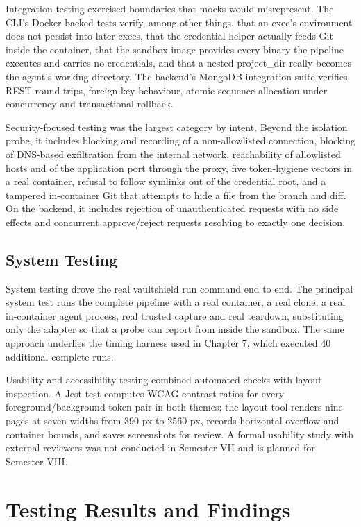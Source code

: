 \documentclass[12pt,a4paper,oneside]{report}
\begin{document}
Integration testing exercised boundaries that mocks would misrepresent. The CLI's Docker-backed tests verify, among other things, that an exec's environment does not persist into later execs, that the credential helper actually feeds Git inside the container, that the sandbox image provides every binary the pipeline executes and carries no credentials, and that a nested project\_\allowbreak{}dir really becomes the agent's working directory. The backend's MongoDB integration suite verifies REST round trips, foreign-key behaviour, atomic sequence allocation under concurrency and transactional rollback.

Security-focused testing was the largest category by intent. Beyond the isolation probe, it includes blocking and recording of a non-allowlisted connection, blocking of DNS-based exfiltration from the internal network, reachability of allowlisted hosts and of the application port through the proxy, five token-hygiene vectors in a real container, refusal to follow symlinks out of the credential root, and a tampered in-container Git that attempts to hide a file from the branch and diff. On the backend, it includes rejection of unauthenticated requests with no side effects and concurrent approve/reject requests resolving to exactly one decision.

\subsection{System Testing}\label{system-testing}

System testing drove the real vaultshield run command end to end. The principal system test runs the complete pipeline with a real container, a real clone, a real in-container agent process, real trusted capture and real teardown, substituting only the adapter so that a probe can report from inside the sandbox. The same approach underlies the timing harness used in Chapter 7, which executed 40 additional complete runs.

Usability and accessibility testing combined automated checks with layout inspection. A Jest test computes WCAG contrast ratios for every foreground/background token pair in both themes; the layout tool renders nine pages at seven widths from 390 px to 2560 px, records horizontal overflow and container bounds, and saves screenshots for review. A formal usability study with external reviewers was not conducted in Semester VII and is planned for Semester VIII.

\section{Testing Results and Findings}\label{testing-results-and-findings}
\end{document}
